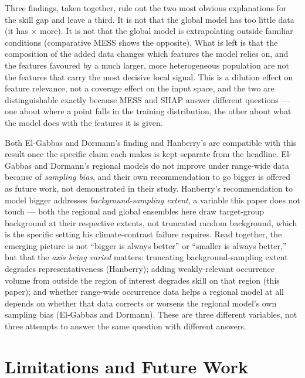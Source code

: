 Three findings, taken together, rule out the two most obvious explanations
for the skill gap and leave a third. It is not that the global model has too
little data (it has \DataMultiple{}$\times$ more). It is not that the global
model is extrapolating outside familiar conditions (comparative MESS shows
the opposite). What is left is that the composition of the added data
changes which features the model relies on, and the features favoured by a
much larger, more heterogeneous population are not the features that carry
the most decisive local signal. This is a dilution effect on feature
relevance, not a coverage effect on the input space, and the two are
distinguishable exactly because MESS and SHAP answer different questions ---
one about where a point falls in the training distribution, the other about
what the model does with the features it is given.

 Both
El-Gabbas and Dormann's finding \citep{elgabbas2018} and Hanberry's \citep{hanberry2026} are compatible with this
result once the specific claim each makes is kept separate from the
headline. El-Gabbas and Dormann's regional models do not improve under
range-wide data because of \emph{sampling bias}, and their own recommendation
to go bigger is offered as future work, not demonstrated in their study.
Hanberry's recommendation to model bigger addresses \emph{background-sampling
extent}, a variable this paper does not touch --- both the regional and
global ensembles here draw target-group background at their respective
extents, not truncated random background, which is the specific setting his
climate-contrast failure requires. Read together, the emerging picture is not
``bigger is always better'' or ``smaller is always better,'' but that the
\emph{axis being varied} matters: truncating background-sampling extent
degrades representativeness (Hanberry); adding weakly-relevant occurrence
volume from outside the region of interest degrades skill on that region
(this paper); and whether range-wide occurrence data helps a regional model
at all depends on whether that data corrects or worsens the regional model's
own sampling bias (El-Gabbas and Dormann). These are three different
variables, not three attempts to answer the same question with different
answers.

\section{Limitations and Future Work}

